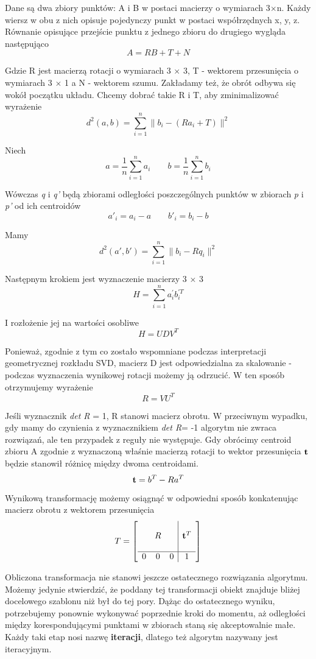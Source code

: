\documentclass[12pt]{article}
\begin{document}
Dane są dwa zbiory punktów: A i B w postaci macierzy o wymiarach 3$\times$n. Każdy wiersz w obu z nich opisuje pojedynczy punkt w postaci współrzędnych x, y, z. Równanie opisujące przejście punktu z jednego zbioru do drugiego wygląda następująco
\[A = R B + T + N \]

Gdzie R jest macierzą rotacji o wymiarach 3 $\times$ 3, T - wektorem przesunięcia o wymiarach 3 $\times$ 1 a N - wektorem szumu. Zakładamy też, że obrót odbywa się wokół początku układu. Chcemy dobrać takie R i T, aby zminimalizować wyrażenie
\[ d^2(a, b) = \sum_{i=1}^n \| b_{i} - (Ra_i+T)\|^2 \]

Niech 
\[a = \frac{1}{n} \sum_{i=1}^n a_i \qquad b = \frac{1}{n} \sum_{i=1}^n b_i \]

Wówczas \emph{q} i \emph{q'} będą zbiorami odległości poszczególnych punktów w zbiorach \emph{p} i \emph{p'} od ich centroidów
\[a'_i = a_i - a \qquad b'_i = b_i - b \]

Mamy
\[d^2(a', b') = \sum_{i=1}^n \| b_{i} - Rq_{i}\|^2 \]

Następnym krokiem jest wyznaczenie macierzy 3 $\times$ 3 
\[H = \sum_{i=1}^n a_i^{'} b_{i}^{'T} \]

I rozłożenie jej na wartości osobliwe
\[H = UDV^T \]

Ponieważ, zgodnie z tym co zostało wspomniane podczas interpretacji geometrycznej rozkładu SVD, macierz D jest odpowiedzialna za skalowanie - podczas wyznaczenia wynikowej rotacji możemy ją odrzucić. W ten sposób otrzymujemy wyrażenie
\[R = VU^T \]

Jeśli wyznacznik \emph{det R} = 1, R stanowi macierz obrotu. W przeciwnym wypadku, gdy mamy do czynienia z wyznacznikiem \emph{det R}= -1 algorytm nie zwraca rozwiązań, ale ten przypadek z reguły nie występuje. Gdy obrócimy centroid zbioru A zgodnie z wyznaczoną właśnie macierzą rotacji to wektor przesunięcia $\vb{t}$ będzie stanowił różnicę między dwoma centroidami.
\[\vb{t} = b^T - R a^T \]

Wynikową transformację możemy osiągnąć w odpowiedni sposób konkatenując macierz obrotu z wektorem przesunięcia
\[T = \left[
\begin{array}{ccc|c}
& & & \\
& R & & \vb{t}^T \\
& & & \\
\hline
0 & 0 & 0 & 1
\end{array}
\right]
\]

Obliczona transformacja nie stanowi jeszcze ostatecznego rozwiązania algorytmu. Możemy jedynie stwierdzić, że poddany tej transformacji obiekt znajduje bliżej docelowego szablonu niż był do tej pory. Dążąc do ostatecznego wyniku, potrzebujemy ponownie wykonywać poprzednie kroki do momentu, aż odległości między korespondującymi punktami w zbiorach staną się akceptowalnie małe. Każdy taki etap nosi nazwę \textbf{iteracji}, dlatego też algorytm nazywany jest iteracyjnym.
\end{document}
